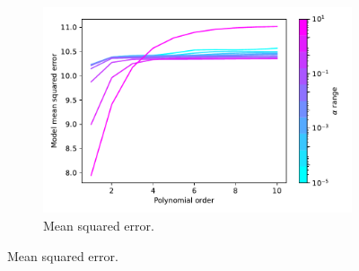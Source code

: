 \documentclass{article}
\begin{document}
\begin{figure}
\begin{subfigure}[b]{.45\textwidth}
\includegraphics[width=\textwidth]{Q2_8.pdf}
\caption{Mean squared error.}


\end{subfigure}
\end{figure}
\end{document}
